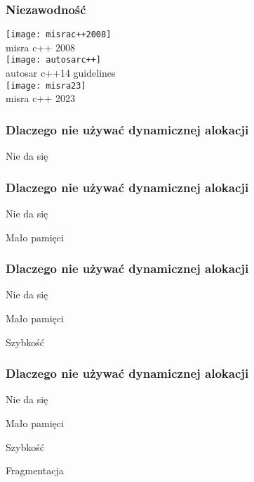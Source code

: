 \documentclass{beamer}
\makeatletter
\newenvironment{myitemize}{%
   \setlength{\topsep}{0pt}
   \setlength{\partopsep}{0pt}
   \renewcommand*{\@listi}{\leftmargin\leftmargini \parsep\z@ \topsep\z@ \itemsep\z@}
   \let\@listI\@listi
   \itemize
}{\enditemize}
\makeatother
\begin{document}
\begin{frame}[t]
    \frametitle{Niezawodność}

    \begin{center}
        \texttt{[image: misrac++2008]}\\
        \tiny \cite{misrac++2008} misra c++ 2008\\
        \vspace{5 mm}
        \texttt{[image: autosarc++]}\\
        \tiny \cite{autosarc++14} autosar c++14 guidelines\\  
        \vspace{5 mm}
        \texttt{[image: misra23]}\\
        \tiny \cite{misrac++2023} misra c++ 2023\\  
    \end{center}    
\end{frame}
\begin{frame}[t]
    \frametitle{Dlaczego nie używać dynamicznej alokacji}
    \begin{myitemize}
        \item Nie da się
    \end{myitemize}
\end{frame}
\begin{frame}[t]
    \frametitle{Dlaczego nie używać dynamicznej alokacji}
    \begin{myitemize}
        \item Nie da się
        \item Mało pamięci
    \end{myitemize}
\end{frame}
\begin{frame}[t]
    \frametitle{Dlaczego nie używać dynamicznej alokacji}
    \begin{myitemize}
        \item Nie da się
        \item Mało pamięci
        \item Szybkość
    \end{myitemize}
\end{frame}
\begin{frame}[t]
    \frametitle{Dlaczego nie używać dynamicznej alokacji}
    \begin{myitemize}
        \item Nie da się
        \item Mało pamięci
        \item Szybkość
        \item Fragmentacja
    \end{myitemize}
\end{frame}
\end{document}
